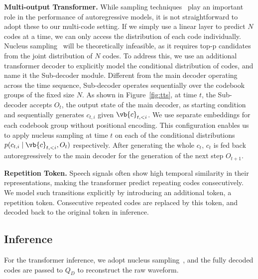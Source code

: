 \documentclass[letterpaper]{article} %
\begin{document}
\textbf{Multi-output Transformer.}
While sampling techniques~\cite{Holtzman2020The,fan-etal-2018-hierarchical} play an important role in the performance of autoregressive models, it is not straightforward to adopt these to our multi-code setting.
If we simply use a linear layer to predict $N$ codes at a time, we can only access the distribution of each code individually.
Nucleus sampling~\cite{Holtzman2020The} will be theoretically infeasible, as it requires top-p candidates from the joint distribution of $N$ codes.
To address this, we use an additional transformer decoder to explicitly model the conditional distribution of codes, and name it the Sub-decoder module.
Different from the main decoder operating across the time sequence, Sub-decoder operates sequentially over the codebook groups of the fixed size $N$.
As shown in Figure~\ref{fig:tts}, at time $t$, the Sub-decoder accepts $O_{t}$, the output state of the main decoder, as starting condition and sequentially generates $c_{t,i}$ given $\vb{c}_{t,<i}$.
We use separate embeddings for each codebook group without positional encoding.
This configuration enables us to apply nucleus sampling at time $t$ on each of the conditional distributions $p(c_{t,i}\mid \vb{c}_{t,<i}, O_{t})$ respectively.
After generating the whole $c_t$, $c_t$ is fed back autoregressively to the main decoder for the generation of the next step $O_{t+1}$.

\textbf{Repetition Token.}
Speech signals often show high temporal similarity in their representations, making the transformer predict repeating codes consecutively.
We model such transitions explicitly by introducing an additional token, a repetition token.
Consecutive repeated codes are replaced by this token, and decoded back to the original token in inference.

\subsection{Inference}
\label{ssec:inf}
For the transformer inference, we adopt nucleus sampling~\cite{Holtzman2020The}, and the fully decoded codes are passed to $Q_D$ to reconstruct the raw waveform.
\end{document}
